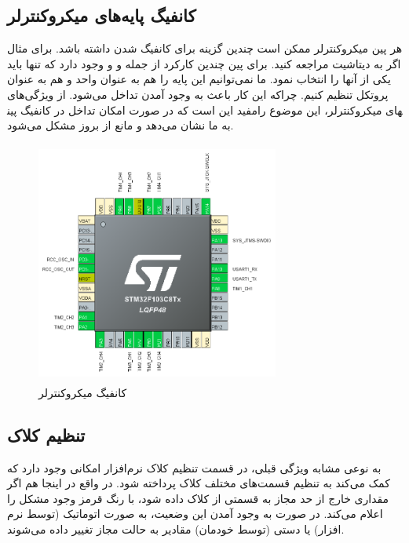 \subsection{کانفیگ پایه‌های میکروکنترلر}
هر پین میکروکنترلر ممکن است چندین گزینه برای کانفیگ شدن داشته باشد.  برای مثال اگر به دیتاشیت  مراجعه کنید. برای پین  چندین کارکرد از جمله  و  و  وجود دارد که تنها باید یکی از آنها را انتخاب نمود. ما نمی‌توانیم این پایه را هم به عنوان  واحد  و هم به عنوان  پروتکل  تنظیم کنیم. چراکه این کار باعث به وجود آمدن تداخل می‌شود. از ویژگی‌های مفید  این است که در صورت امکان تداخل در کانفیگ پین‎های میکروکنترلر، این موضوع را به ما نشان می‌دهد و مانع از بروز مشکل می‌شود.

    \begin{figure}[!h]
	\centering
	\includegraphics[height=8cm,width=8cm]{./Images/CH4/CubeMX_2.PNG}
	\caption[کانفیگ میکروکنترلر]{کانفیگ میکروکنترلر}
	\label{کانفیگ میکروکنترلر}
	\end{figure}

\subsection{تنظیم کلاک}
به نوعی مشابه ویژگی قبلی، در قسمت تنظیم کلاک نرم‌افزار  امکانی وجود دارد که کمک می‌کند به تنظیم قسمت‌های مختلف کلاک  پرداخته شود. در واقع در اینجا هم اگر مقداری خارج از حد مجاز به قسمتی از کلاک داده شود، با رنگ قرمز وجود مشکل را اعلام می‌کند. در صورت به وجود آمدن این وضعیت، به صورت اتوماتیک (توسط نرم افزار) یا دستی (توسط خودمان) مقادیر به حالت مجاز تغییر داده می‌شوند.

